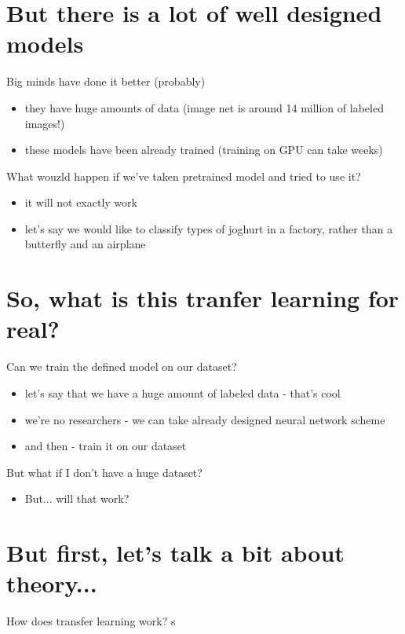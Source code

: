\documentclass[aspectratio=1610,english]{beamer} %
\begin{document}
 	\section{But there is a lot of well designed models}
	\begin{frame}{Big minds have done it better (probably)}
		 \begin{itemize}
		 	\item they have huge amounts of data (image net is around 14 million of labeled images!)
		 	\item these models have been already trained (training on GPU can take weeks)
		 \end{itemize}
	\end{frame}

 	\begin{frame}{What wouzld happen if we've taken pretrained model and tried to use it?}
		 \begin{itemize}
		 	\item it will not exactly work
		 	\item let's say we would like to classify types of joghurt in a factory, rather than a butterfly and an airplane
		 \end{itemize}
	\end{frame}

\section{So, what is this tranfer learning for real?}
 	\begin{frame}{Can we train the defined model on our dataset?}
		\begin{itemize}
			\item let's say that we have a huge amount of labeled data - that's cool
			\item we're no researchers - we can take already designed neural network scheme
			\item and then - train it on our dataset
		\end{itemize}
	\end{frame}
 
 	\begin{frame}{But what if I don't have a huge dataset?}
 		\begin{itemize}
		 	\item But... will that work? 
		 \end{itemize}
	\end{frame}

\section{But first, let's talk a bit about theory...}
  	\begin{frame}{How does transfer learning work?}
		s%
	 \end{frame}
 
\end{document}
